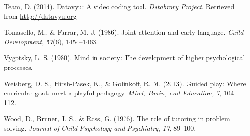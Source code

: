 \documentclass[10pt, letterpaper]{article}
\begin{document}
\hypertarget{ref-datavyu}{}
Team, D. (2014). Datavyu: A video coding tool. \emph{Databrary Project}.
Retrieved from \url{http://datavyu.org}

\hypertarget{ref-Tomasello1986}{}
Tomasello, M., \& Farrar, M. J. (1986). Joint attention and early
language. \emph{Child Development}, \emph{57}(6), 1454--1463.

\hypertarget{ref-Vygotsky1980}{}
Vygotsky, L. S. (1980). Mind in society: The development of higher
psychological processes.

\hypertarget{ref-Weisberg2013}{}
Weisberg, D. S., Hirsh-Pasek, K., \& Golinkoff, R. M. (2013). Guided
play: Where curricular goals meet a playful pedagogy. \emph{Mind, Brain,
and Education}, \emph{7}, 104--112.

\hypertarget{ref-Wood1976}{}
Wood, D., Bruner, J. S., \& Ross, G. (1976). The role of tutoring in
problem solving. \emph{Journal of Child Psychology and Psychiatry},
\emph{17}, 89--100.


\end{document}

